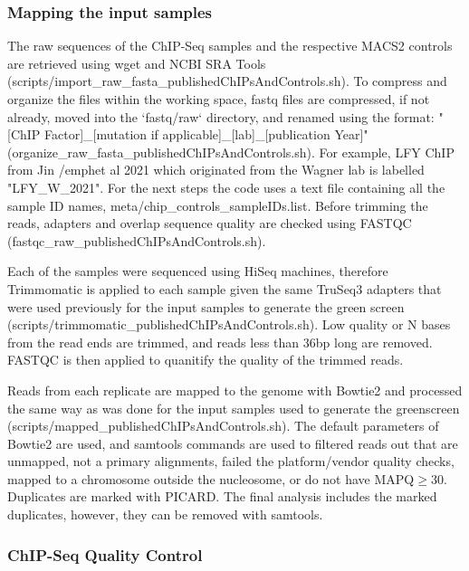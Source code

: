 \documentclass{article}
\begin{document}
\begin{sloppypar}
\subsubsection{Mapping the input samples}
The raw sequences of the ChIP-Seq samples and the respective MACS2 controls are retrieved using wget and NCBI SRA Tools ({\selectfont scripts/import\_raw\_fasta\_publishedChIPsAndControls.sh}). To compress and organize the files within the working space, fastq files are compressed, if not already, moved into the `fastq/raw` directory, and renamed using the format: "[ChIP Factor]\_[mutation if applicable]\_[lab]\_[publication Year]" ({\selectfont organize\_raw\_fasta\_publishedChIPsAndControls.sh}). For example, LFY ChIP from Jin /emph{et al} 2021 which originated from the Wagner lab is labelled "LFY\_W\_2021". For the next steps the code uses a text file containing all the sample ID names, {\selectfont meta/chip\_controls\_sampleIDs.list}. Before trimming the reads, adapters and overlap sequence quality are checked using FASTQC ({\selectfont fastqc\_raw\_publishedChIPsAndControls.sh}).

Each of the samples were sequenced using HiSeq machines, therefore Trimmomatic is applied to each sample given the same TruSeq3 adapters that were used previously for the input samples to generate the green screen ({\selectfont scripts/trimmomatic\_publishedChIPsAndControls.sh}). Low quality or N bases from the read ends are trimmed, and reads less than 36bp long are removed. FASTQC is then applied to quanitify the quality of the trimmed reads.

Reads from each replicate are mapped to the genome with Bowtie2 and processed the same way as was done for the input samples used to generate the greenscreen ({\selectfont scripts/mapped\_publishedChIPsAndControls.sh}). The default parameters of Bowtie2 are used, and samtools commands are used to filtered reads out that are unmapped, not a primary alignments, failed the platform/vendor quality checks, mapped to a chromosome outside the nucleosome, or do not have MAPQ$\geq$30. Duplicates are marked with PICARD. The final analysis includes the marked duplicates, however, they can be removed with samtools.


\subsubsection{ChIP-Seq Quality Control}


\end{sloppypar}
\end{document}
